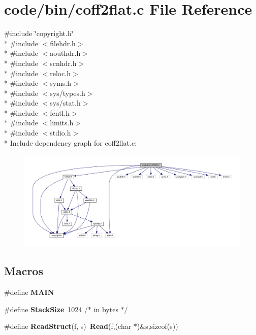 \section{code/bin/coff2flat.c File Reference}
\label{coff2flat_8c}
{\ttfamily \#include \char`\"{}copyright.\+h\char`\"{}}\\*
{\ttfamily \#include $<$filehdr.\+h$>$}\\*
{\ttfamily \#include $<$aouthdr.\+h$>$}\\*
{\ttfamily \#include $<$scnhdr.\+h$>$}\\*
{\ttfamily \#include $<$reloc.\+h$>$}\\*
{\ttfamily \#include $<$syms.\+h$>$}\\*
{\ttfamily \#include $<$sys/types.\+h$>$}\\*
{\ttfamily \#include $<$sys/stat.\+h$>$}\\*
{\ttfamily \#include $<$fcntl.\+h$>$}\\*
{\ttfamily \#include $<$limits.\+h$>$}\\*
{\ttfamily \#include $<$stdio.\+h$>$}\\*
Include dependency graph for coff2flat.\+c\+:
\nopagebreak
\begin{figure}[H]
\begin{center}
\leavevmode
\includegraphics[width=350pt]{coff2flat_8c__incl}
\end{center}
\end{figure}
\subsection*{Macros}
\begin{DoxyCompactItemize}
\item 
\#define {\bf M\+A\+IN}
\item 
\#define {\bf Stack\+Size}~1024      /$\ast$ in bytes $\ast$/
\item 
\#define {\bf Read\+Struct}(f,  s)~{\bf Read}(f,(char $\ast$)\&s,sizeof(s))
\end{DoxyCompactItemize}
